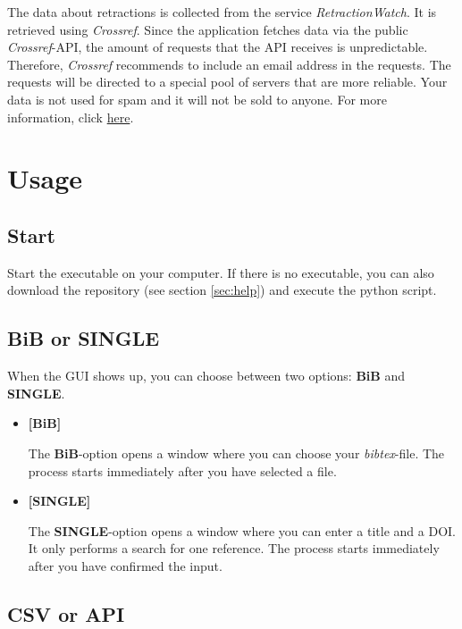 \documentclass[11pt]{article}
\begin{document}
    The data about retractions is collected from the service \textit{RetractionWatch}. It is retrieved using \textit{Crossref}.
    Since the application fetches data via the public \textit{Crossref}-API, the amount of requests that the API receives is unpredictable.
    Therefore, \textit{Crossref} recommends to include an email address in the requests. The requests will be directed to a special pool of servers that are more reliable.
    Your data is not used for spam and it will not be sold to anyone. For more information, click \href{https://www.crossref.org/documentation/retrieve-metadata/rest-api/tips-for-using-the-crossref-rest-api/}{here}.

    \section{Usage}

        \subsection{Start}
    
        Start the executable on your computer. If there is no executable, you can also download the repository (see section \ref{sec:help}) and execute the python script.

        \subsection{BiB or SINGLE}

        When the GUI shows up, you can choose between two options: \textbf{BiB} and \textbf{SINGLE}.

        \begin{itemize}
            \item \textbf{[BiB]}
            
            The \textbf{BiB}-option opens a window where you can choose your \textit{bibtex}-file. The process starts immediately after you have selected a file.
            
            \item \textbf{[SINGLE]}
            
            The \textbf{SINGLE}-option opens a window where you can enter a title and a DOI. It only performs a search for one reference.
            The process starts immediately after you have confirmed the input.
        \end{itemize}

        \subsection{CSV or API}
\end{document}
